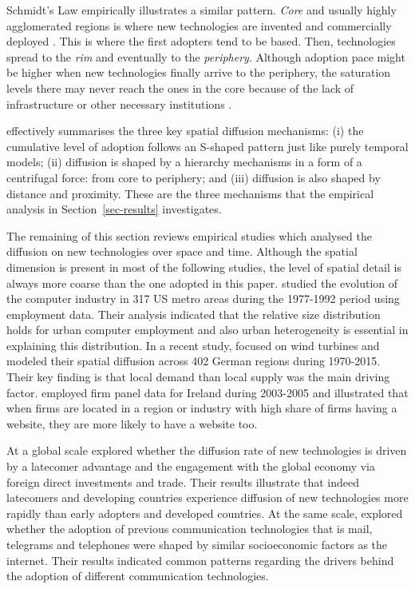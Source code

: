 \documentclass[
  authoryear,
  preprint,
  3p]{elsarticle}
\begin{document}
Schmidt's Law empirically illustrates a similar pattern. \emph{Core} and
usually highly agglomerated regions is where new technologies are
invented and commercially deployed \citep{grubler1990rise}. This is
where the first adopters tend to be based. Then, technologies spread to
the \emph{rim} and eventually to the \emph{periphery}. Although adoption
pace might be higher when new technologies finally arrive to the
periphery, the saturation levels there may never reach the ones in the
core because of the lack of infrastructure or other necessary
institutions \citep{leibowicz2016representing}.

\citet{grubler1990rise} effectively summarises the three key spatial
diffusion mechanisms: (i) the cumulative level of adoption follows an
S-shaped pattern just like purely temporal models; (ii) diffusion is
shaped by a hierarchy mechanisms in a form of a centrifugal force: from
core to periphery; and (iii) diffusion is also shaped by distance and
proximity. These are the three mechanisms that the empirical analysis in
Section~\ref{sec-results} investigates.

The remaining of this section reviews empirical studies which analysed
the diffusion on new technologies over space and time. Although the
spatial dimension is present in most of the following studies, the level
of spatial detail is always more coarse than the one adopted in this
paper. \citet{beardsell1999spatial} studied the evolution of the
computer industry in 317 US metro areas during the 1977-1992 period
using employment data. Their analysis indicated that the relative size
distribution holds for urban computer employment and also urban
heterogeneity is essential in explaining this distribution. In a recent
study, \citet{bednarz2020pulled} focused on wind turbines and modeled
their spatial diffusion across 402 German regions during 1970-2015.
Their key finding is that local demand than local supply was the main
driving factor. \citet{haller2011determinants} employed firm panel data
for Ireland during 2003-2005 and illustrated that when firms are located
in a region or industry with high share of firms having a website, they
are more likely to have a website too.

At a global scale \citet{perkins2005international} explored whether the
diffusion rate of new technologies is driven by a latecomer advantage
and the engagement with the global economy via foreign direct
investments and trade. Their results illustrate that indeed latecomers
and developing countries experience diffusion of new technologies more
rapidly than early adopters and developed countries. At the same scale,
\citet{perkins2011internet} explored whether the adoption of previous
communication technologies that is mail, telegrams and telephones were
shaped by similar socioeconomic factors as the internet. Their results
indicated common patterns regarding the drivers behind the adoption of
different communication technologies.
\end{document}
